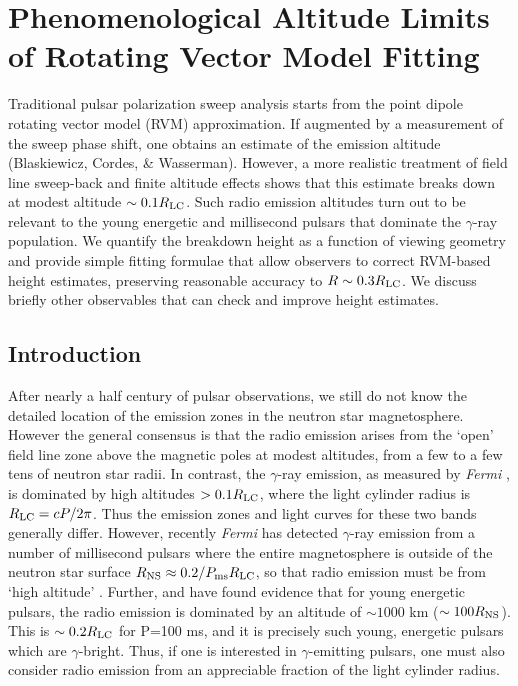 \chapter[Phenomenological Altitude Limits of RVM]{Phenomenological Altitude Limits of Rotating Vector Model Fitting}
\label{chapter:phenomenologicalFitting}


Traditional pulsar polarization sweep analysis starts from the point dipole rotating vector model
(RVM) approximation. If augmented by a measurement of the sweep phase shift, one obtains
an estimate of the emission altitude (Blaskiewicz, Cordes, \& Wasserman). However, a more
realistic treatment of field line sweep-back and finite altitude effects shows that this
estimate breaks down at modest altitude $\sim 0.1R_{\rm{LC}}$. Such radio emission
altitudes turn out to be relevant to the young energetic and millisecond pulsars that dominate
the $\gamma$-ray population.  We quantify the breakdown height as a function of
viewing geometry and provide simple fitting formulae that allow observers to correct RVM-based
height estimates, preserving reasonable accuracy to $R\sim 0.3R_{\rm{LC}}$. We discuss briefly
other observables that can check and improve height estimates.




\section{Introduction}

	After nearly a half century of pulsar observations, we still do not know
the detailed location of the emission zones in the neutron star magnetosphere.
However the general consensus is that the radio emission arises from the `open'
field line zone above the magnetic poles at modest altitudes, from a few to a few 
tens of neutron star radii. In contrast, the $\gamma$-ray
emission, as measured by {\it Fermi} \citep{psrcat}, is dominated by
high altitudes $> 0.1 R_{\rm{LC}}$, where the light cylinder radius is $R_{\rm{LC}}=cP/2\pi$.
Thus the emission zones and light curves for these two bands generally differ.
However, recently {\it Fermi} has detected $\gamma$-ray emission from a number
of millisecond pulsars where the entire magnetosphere is outside of
the neutron star surface
$R_{\rm{NS}} \approx 0.2/P_{\rm ms} R_{\rm{LC}}$, so that radio emission must be from `high altitude' \citep{kerr2012five}.
Further, \cite{karastergiou2007empirical} and \cite{johnston2006profile} have found evidence 
that for young energetic pulsars, the radio emission is dominated by an altitude of
$\sim 1000$ km ($\sim 100 R_{\rm{NS}}$). This is $\sim 0.2 R_{\rm{LC}}$ for P=100 ms, and
it is precisely such young, energetic pulsars which are $\gamma$-bright.
Thus, if one is interested in $\gamma$-emitting pulsars, one must also
consider radio emission from an appreciable fraction of the light cylinder radius.

